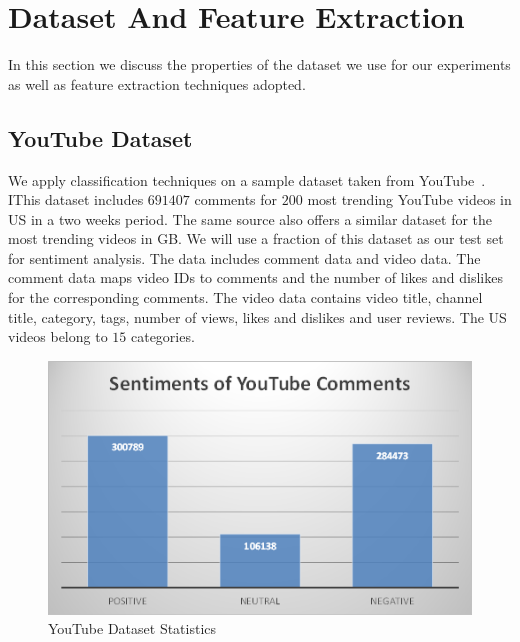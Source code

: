 \section{Dataset And Feature Extraction}
\label{sec:data}
In this section we discuss the properties of the dataset we use for our experiments as well as feature extraction techniques adopted.

\subsection{YouTube Dataset}
\label{sec:youtubedataset}
We apply classification techniques on a sample dataset taken from YouTube~\cite{youtubedata}. 
IThis dataset includes $691407$ comments for $200$ most trending YouTube videos in US in a two weeks period. 
The same source also offers a similar dataset for the most trending videos in GB. 
We will use a fraction of this dataset as our test set for sentiment analysis. 
The data includes comment data and video data. The comment data maps video IDs to comments and the number of likes and dislikes for the corresponding comments. The video data contains video title, channel title, category, tags, number of views, likes and dislikes and user reviews. The US videos belong to $15$ categories.

\begin{figure}%
\centering
\includegraphics[width=0.6\columnwidth]{figures/datastats.png}%
\caption{YouTube Dataset Statistics}%
\label{fig:datastats}%
\end{figure}

